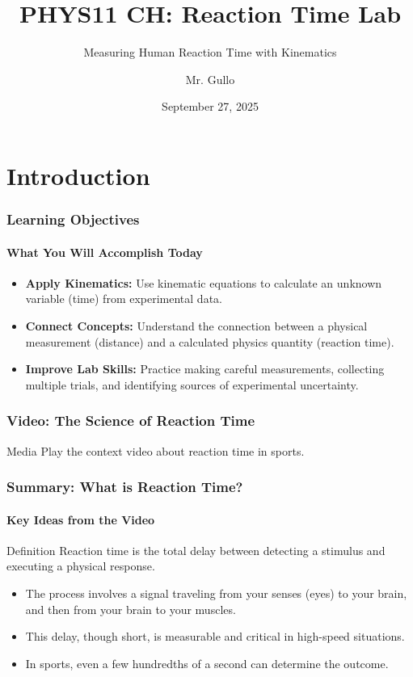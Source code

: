 \documentclass{beamer}
\title[Reaction Time Lab]{PHYS11 CH: Reaction Time Lab}
\subtitle{Measuring Human Reaction Time with Kinematics}
\author[Mr. Gullo]{Mr. Gullo}
\date[Sep 27, 2025]{September 27, 2025}
\begin{document}
\frame{\titlepage}

\section{Introduction}

\begin{frame}
\frametitle{Learning Objectives}
\framesubtitle{What You Will Accomplish Today}
    \begin{itemize}
        \item \textbf{Apply Kinematics:} Use kinematic equations to calculate an unknown variable (time) from experimental data.
        \item \textbf{Connect Concepts:} Understand the connection between a physical measurement (distance) and a calculated physics quantity (reaction time).
        \item \textbf{Improve Lab Skills:} Practice making careful measurements, collecting multiple trials, and identifying sources of experimental uncertainty.
    \end{itemize}
\end{frame}

\begin{frame}
\frametitle{Video: The Science of Reaction Time}
    \vfill
    \begin{alertblock}{Media}
        Play the context video about reaction time in sports.
    \end{alertblock}
    \vfill
\end{frame}

\begin{frame}
\frametitle{Summary: What is Reaction Time?}
\framesubtitle{Key Ideas from the Video}
    \begin{block}{Definition}
        Reaction time is the total delay between detecting a stimulus and executing a physical response.
    \end{block}
    \pause
    \begin{itemize}
        \item The process involves a signal traveling from your senses (eyes) to your brain, and then from your brain to your muscles. \pause
        \item This delay, though short, is measurable and critical in high-speed situations. \pause
        \item In sports, even a few hundredths of a second can determine the outcome.
    \end{itemize}
\end{frame}
\end{document}

